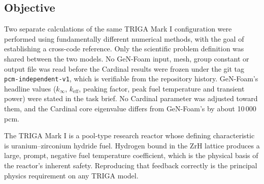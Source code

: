 \documentclass[11pt,a4paper]{article}
\newcommand{\keff}{\ensuremath{k_{\mathrm{eff}}}}
\newcommand{\kinf}{\ensuremath{k_{\infty}}}
\newcommand{\pcm}{\,pcm}
\begin{document}
\subsection{Objective}
Two separate calculations of the same TRIGA Mark I configuration were performed using
fundamentally different numerical methods, with the goal of establishing a cross-code
reference. Only the scientific problem definition was shared between the two models. No
GeN-Foam input, mesh, group constant or output file was read before the Cardinal results were
frozen under the git tag \texttt{pcm-independent-v1}, which is verifiable from the repository
history. GeN-Foam's headline values ($\kinf$, $\keff$, peaking factor, peak fuel temperature
and transient power) were stated in the task brief. No Cardinal parameter was adjusted toward
them, and the Cardinal core eigenvalue differs from GeN-Foam's by about 10\,000\pcm.

The TRIGA Mark I is a pool-type research reactor whose defining characteristic is
uranium--zirconium hydride fuel. Hydrogen bound in the ZrH lattice produces a large, prompt,
negative fuel temperature coefficient, which is the physical basis of the reactor's inherent
safety. Reproducing that feedback correctly is the principal physics requirement on any
TRIGA model.
\end{document}

